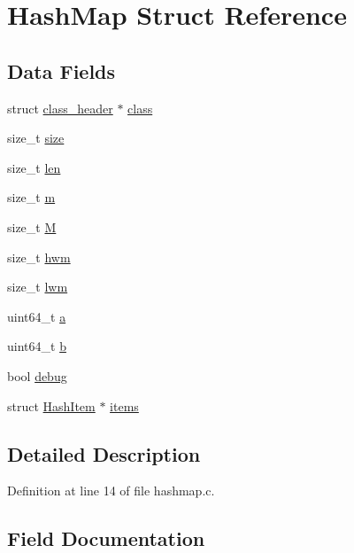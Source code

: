 \hypertarget{structHashMap}{}\section{Hash\+Map Struct Reference}
\label{structHashMap}
\subsection*{Data Fields}
\begin{DoxyCompactItemize}
\item 
struct \mbox{\hyperlink{structclass__header}{class\+\_\+header}} $\ast$ \mbox{\hyperlink{structHashMap_aef6bbfa93b63be380becf8acc007eeaa}{class}}
\item 
size\+\_\+t \mbox{\hyperlink{structHashMap_aae8bf9f119b0659b9ad29261e2e3d520}{size}}
\item 
size\+\_\+t \mbox{\hyperlink{structHashMap_a464e5e54144c37706fe47c69371150a0}{len}}
\item 
size\+\_\+t \mbox{\hyperlink{structHashMap_aa2de9d8ff82650c9a88673cfa909932d}{m}}
\item 
size\+\_\+t \mbox{\hyperlink{structHashMap_a1afdecfc482f9bcbf1af8e77995690b9}{M}}
\item 
size\+\_\+t \mbox{\hyperlink{structHashMap_a6ebe07175f56adb259c8a69f0488faca}{hwm}}
\item 
size\+\_\+t \mbox{\hyperlink{structHashMap_a5612a2ea2ff70d737e073799a8c6f14c}{lwm}}
\item 
uint64\+\_\+t \mbox{\hyperlink{structHashMap_a786bc56e174662272a694a7cdf8b85f2}{a}}
\item 
uint64\+\_\+t \mbox{\hyperlink{structHashMap_ac299cbbbb3099d161e9608669f5eb1d8}{b}}
\item 
bool \mbox{\hyperlink{structHashMap_a9ef225abb9953fa741218d06489d06ff}{debug}}
\item 
struct \mbox{\hyperlink{structHashItem}{Hash\+Item}} $\ast$ \mbox{\hyperlink{structHashMap_aa763bbbe8b195b0070c3d2e2c1c4e4c2}{items}}
\end{DoxyCompactItemize}


\subsection{Detailed Description}


Definition at line 14 of file hashmap.\+c.



\subsection{Field Documentation}
\mbox{\label{structHashMap_a786bc56e174662272a694a7cdf8b85f2}} 
